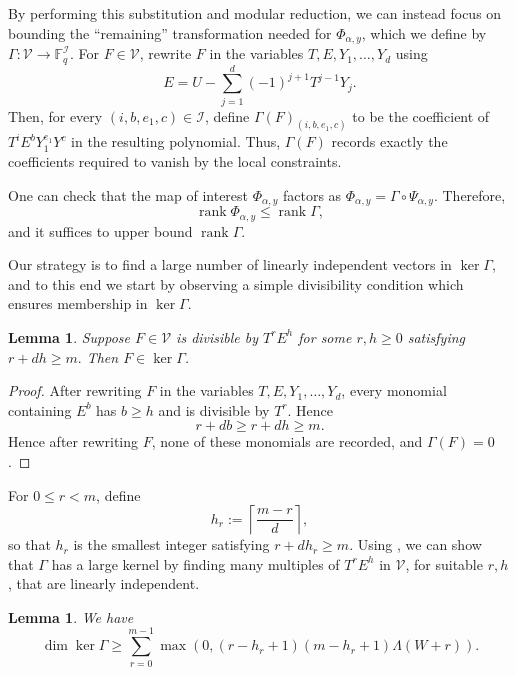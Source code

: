 \documentclass[11pt]{article}
\newtheorem{lemma}[theorem]{Lemma}
\newcommand{\F}{\mathbb F}
\let \cref \Cref
\begin{document}
By performing this substitution and modular reduction, we can instead focus
on bounding the ``remaining'' transformation needed for
$\Phi_{\alpha,y}$, which we define by $\Gamma:\mathcal V\to \F_q^{\mathcal I}.$
For $F\in\mathcal V$, rewrite $F$ in the variables
$T,E,Y_1,\ldots,Y_d$ using
\begin{equation}\label{eq:E-sub}
E
=
U-\sum_{j=1}^d(-1)^{j+1}T^{j-1}Y_j.
\end{equation}
Then, for every $(i,b,e_1,c)\in\mathcal I$, define
$\Gamma(F)_{(i,b,e_1,c)}$ to be the coefficient of $T^iE^bY_1^{e_1}Y^c$
in the resulting polynomial.
Thus, $\Gamma(F)$ records exactly the coefficients required to vanish by
the local constraints.

One can check that the map of interest $\Phi_{\alpha, y}$ factors as $\Phi_{\alpha,y}
=
\Gamma\circ\Psi_{\alpha,y}.$
Therefore,
\[
\operatorname{rank} \Phi_{\alpha,y}
\le
\operatorname{rank}\Gamma,
\]
and it suffices to upper bound $\operatorname{rank} \Gamma$.

Our strategy is to find a large number of linearly independent vectors in $\ker \Gamma$, and to this end we start by observing a simple divisibility condition which ensures membership in $\ker \Gamma$.
\begin{lemma}\label{lem:kernel-criterion}
Suppose $F\in\mathcal V$ is divisible by $T^rE^h$ for some $r,h\ge0$
satisfying $r+dh\ge m.$ Then $F\in\ker\Gamma$.
\end{lemma}

\begin{proof}
After rewriting $F$ in the variables $T,E,Y_1,\ldots,Y_d$, every monomial
containing $E^b$ has $b\ge h$ and is divisible by $T^r$. Hence
\[
r+db\ge r+dh\ge m.
\]
Hence after rewriting $F$, none of these monomials are recorded, and
$\Gamma(F)=0$.
\end{proof}

For $0\le r<m$, define
\[
h_r:=\left\lceil\frac{m-r}{d}\right\rceil,
\]
so that $h_r$ is the smallest integer satisfying $r+dh_r\ge m$. Using \cref{lem:kernel-criterion}, we can show that $\Gamma$ has a large kernel by finding many multiples of $T^r E^h$ in $\mathcal{V}$, for suitable $r,h$, that are linearly independent.

\begin{lemma}\label{lem:large-kernel}
We have
\begin{equation}\label{eq:kernel-lower-bound}
\dim\ker\Gamma
\ge
\sum_{r=0}^{m-1}
\max(0,(r-h_r+1)(m-h_r+1)\Lambda(W+r)).
\end{equation}
\end{lemma}
\end{document}
